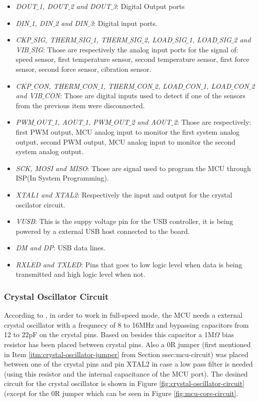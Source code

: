 			\begin{itemize}
				\item\textit{DOUT$\_$1, DOUT$\_$2 and DOUT$\_$3}: Digital Output ports	
				\item\textit{DIN$\_$1, DIN$\_$2 and DIN$\_$3}: Digital input ports.
				\item\textit{CKP$\_$SIG, THERM$\_$SIG$\_$1, THERM$\_$SIG$\_$2, LOAD$\_$SIG$\_$1, LOAD$\_$SIG$\_$2 and VIB$\_$SIG}: Those are respectively the analog input ports for the signal of: speed sensor, first temperature sensor, second temperature sensor, first force sensor, second force sensor, cibration sensor.
				\item\textit{CKP$\_$CON, THERM$\_$CON$\_$1, THERM$\_$CON$\_$2, LOAD$\_$CON$\_$1, LOAD$\_$CON$\_$2 and VIB$\_$CON}: Those are digital inputs used to detect if one of the sensors from the previous item were disconnected.
				\item\textit{PWM$\_$OUT$\_$1, AOUT$\_$1, PWM$\_$OUT$\_$2 and AOUT$\_$2}: Those are respectively: first PWM output, MCU analog input to monitor the first system analog output, second PWM output, MCU analog input to monitor the second system analog output.
				\item\textit{SCK, MOSI and MISO}: Those are signal used to program the MCU through ISP(In System Programming).
				\item\textit{XTAL1 and XTAL2}: Respectively the input and output for the crystal oscilator circuit.
				\item\textit{VUSB}: This is the suppy voltage pin for the USB controller, it is being powered by a external USB host connected to the board.
				\item\textit{DM and DP}: USB data lines.
				\item\textit{RXLED and TXLED}: Pins that goes to low logic level when data is being transmitted and high logic level when not.
			\end{itemize}

		\subsubsection{Crystal Oscillator Circuit}\label{sssec:crystal-oscillator-circuit}
			According to \cite{atmega32u4-datasheet}, in order to work in full-speed mode, the MCU needs a external crystal oscillator with a frequnecy of 8 to 16MHz and bypassing capacitors from 12 to 22pF on the crystal pins. Based on \cite{arduino-leonardo-schematic} besides this capacitor a 1M$\Omega$ bias resistor has been placed between crystal pins. Also a 0R jumper (first mentioned in Item \ref{itm:crystal-oscillator-jumper} from Section {ssec:mcu-circuit}) was placed between one of the crystal pins and pin XTAL2 in case a low pass filter is needed (using this resistor and the internal capacitance of the MCU port). The desined circuit for the crystal oscillator is shown in Figure \ref{fig:crystal-oscillator-circuit} (except for the 0R jumper which can be seen in Figure \ref{fig:mcu-core-circuit}.

